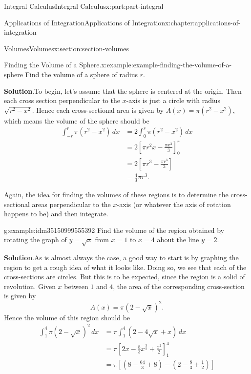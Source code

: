 \documentclass[twoside,10pt,]{book}
\newcommand{\blocktitlefont}{\relax}
\numberwithin{equation}{part}
\newcommand{\amp}{&}
\begin{document}
\begin{partptx}{Integral Calculus}{}{Integral Calculus}{}{}{x:part:part-integral}
\begin{chapterptx}{Applications of Integration}{}{Applications of Integration}{}{}{x:chapter:applications-of-integration}
\begin{sectionptx}{Volumes}{}{Volumes}{}{}{x:section:section-volumes}
\begin{example}{Finding the Volume of a Sphere.}{x:example:example-finding-the-volume-of-a-sphere}
Find the volume of a sphere of radius \(r\).%
\par\smallskip%
\noindent\textbf{\blocktitlefont Solution}.\hypertarget{g:solution:idm35150999558976}{}\quad{}To begin, let's assume that the sphere is centered at the origin. Then each cross section perpendicular to the \(x\)-axis is just a circle with radius \(\sqrt{r^{2} - x^{2}}\). Hence each cross-sectional area is given by \(A(x) = \pi(r^{2} - x^{2})\), which means the volume of the sphere should be%
\begin{align*}
\int_{-r}^{r}\pi(r^{2} - x^{2})\,dx \amp= 2\int_{0}^{r}\pi(r^{2} - x^{2})\,dx\\
\amp= 2\left[\pi r^{2}x - \frac{\pi x^{3}}{3}\right]_{0}^{r}\\
\amp= 2\left[\pi r^{3} - \frac{\pi r^{3}}{3}\right]\\
\amp= \frac{4}{3}\pi r^{3}.
\end{align*}
%
\end{example}
Again, the idea for finding the volumes of these regions is to determine the cross-sectional areas perpendicular to the \(x\)-axis (or whatever the axis of rotation happens to be) and then integrate.%
\begin{example}{}{g:example:idm35150999555392}%
Find the volume of the region obtained by rotating the graph of \(y = \sqrt{x}\) from \(x = 1\) to \(x = 4\) about the line \(y = 2\).%
\par\smallskip%
\noindent\textbf{\blocktitlefont Solution}.\hypertarget{g:solution:idm35150999553344}{}\quad{}As is almost always the case, a good way to start is by graphing the region to get a rough idea of what it looks like. Doing so, we see that each of the cross-sections are circles. But this is to be expected, since the region is a solid of revolution. Given \(x\) between \(1\) and \(4\), the area of the corresponding cross-section is given by%
\begin{equation*}
A(x) = \pi(2 - \sqrt{x})^{2}.
\end{equation*}
Hence the volume of this region should be%
\begin{align*}
\int_{1}^{4}\pi(2 - \sqrt{x})^{2}\,dx \amp= \pi\int_{1}^{4}(2 - 4\sqrt{x} + x)\,dx\\
\amp= \pi\left[2x - \frac{8}{3}x^{\frac{3}{2}} + \frac{x^{2}}{2}\right]_{1}^{4}\\
\amp= \pi\left[\left(8 - \frac{64}{3} + 8\right) - \left(2 - \frac{8}{3} + \frac{1}{2}\right)\right]
\end{align*}
%
\end{example}

\end{sectionptx}
\end{chapterptx}
\end{partptx}
\end{document}
